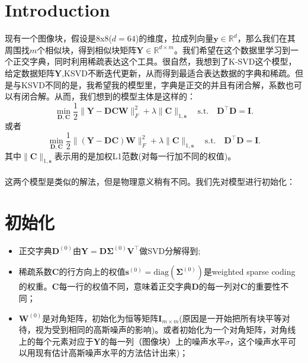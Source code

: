 \documentclass[10pt,twocolumn,letterpaper]{article}
\begin{document}
\section{Introduction}
现有一个图像块，假设是8x8($d=64$)的维度，拉成列向量$\mathbf{y}\in\mathbb{R}^{d}$，那么我们在其周围找$m$个相似块，得到相似块矩阵$\mathbf{Y}\in\mathbb{R}^{d\times m}$。我们希望在这个数据里学习到一个正交字典，同时利用稀疏表达这个工具。很自然，我想到了K-SVD这个模型，给定数据矩阵$\mathbf{Y}$,KSVD不断迭代更新，从而得到最适合表达数据的字典和稀疏。但是与KSVD不同的是，我希望我的模型里，字典是正交的并且有闭合解，系数也可以有闭合解。从而，我们想到的模型主体是这样的：
\begin{equation}
\min_{\mathbf{D},\mathbf{C}}\frac{1}{2}\|\mathbf{Y}-\mathbf{D}\mathbf{C}\mathbf{W}\|_{F}^{2}
+
\lambda\|\mathbf{C}\|_{1,\mathbf{s}}
\quad
\text{s.t.}
\quad
\mathbf{D}^{\top}\mathbf{D} =\mathbf{I}. 
\end{equation}
或者
\begin{equation}
\min_{\mathbf{D},\mathbf{C}}\frac{1}{2}\|(\mathbf{Y}-\mathbf{D}\mathbf{C})\mathbf{W}\|_{F}^{2}
+
\lambda\|\mathbf{C}\|_{1,\mathbf{s}}
\quad
\text{s.t.}
\quad
\mathbf{D}^{\top}\mathbf{D} =\mathbf{I}. 
\end{equation}
其中$\|\mathbf{C}\|_{1,\mathbf{s}}$表示用的是加权L1范数(对每一行加不同的权值)。
\\
\\
这两个模型是类似的解法，但是物理意义稍有不同。我们先对模型进行初始化：


\section{初始化}
\begin{itemize}
\item 正交字典$\mathbf{D}^{(0)}$由$\mathbf{Y}=\mathbf{D}\mathbf{\Sigma}^{(0)}\mathbf{V}^{\top}$做SVD分解得到;
\item 稀疏系数$\mathbf{C}$的行方向上的权值$\mathbf{s}^{(0)}=\text{diag}(\mathbf{\Sigma}^{(0)})$是weighted sparse coding的权重。$\mathbf{C}$每一行的权值不同，意味着正交字典$\mathbf{D}$的每一列对$\mathbf{C}$的重要性不同；
\item $\mathbf{W}^{(0)}$是对角矩阵，初始化为恒等矩阵$\mathbf{I}_{m\times m}$(原因是一开始把所有块平等对待，视为受到相同的高斯噪声的影响)。或者初始化为一个对角矩阵，对角线上的每个元素对应于$\mathbf{Y}$的每一列（图像块）上的噪声水平$\sigma$，这个噪声水平可以用现有估计高斯噪声水平的方法估计出来)；
\end{itemize}
\end{document}
